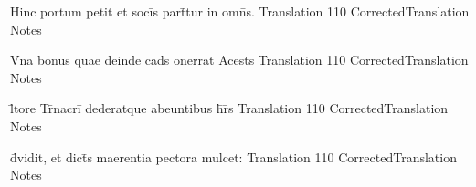 \documentclass[]{book}
\begin{document}
\latline
  {Hinc portum petit et soci\={}s part\={\macron {\i}}tur in omn\={\macron {\i}}s.}
  { Translation }
  {110}
  { CorrectedTranslation }
  { Notes }


\latline
  {V\={\macron {\i}}na bonus quae deinde cad\={\macron {\i}}s oner\={}rat Acest\={}s}
  { Translation }
  {110}
  { CorrectedTranslation }
  { Notes }



\latline
  {l\={\macron {\i}}tore Tr\={\macron {\i}}nacri\={} dederatque abeuntibus h\={}r\={}s}
  { Translation }
  {110}
  { CorrectedTranslation }
  { Notes }


\latline
  {d\={\macron {\i}}vidit, et dict\={\macron {\i}}s maerentia pectora mulcet:}
  { Translation }
  {110}
  { CorrectedTranslation }
  { Notes }
\end{document}
